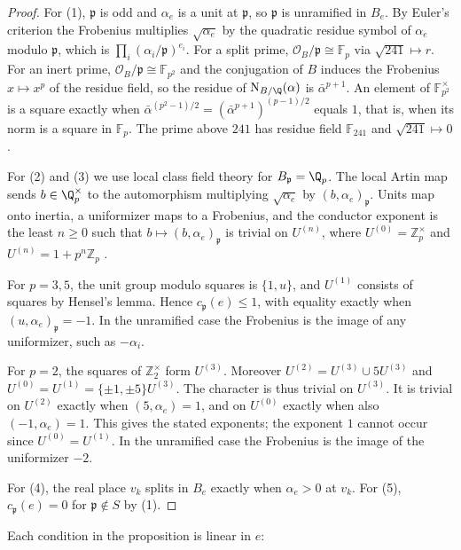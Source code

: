 \begin{proof}
For (1), $\mathfrak p$ is odd and $\alpha_e$ is a unit at $\mathfrak p$, so
$\mathfrak p$ is unramified in $B_e$. By Euler's criterion the Frobenius
multiplies $\sqrt{\alpha_e}$ by the quadratic residue symbol of $\alpha_e$
modulo $\mathfrak p$, which is $\prod_i(\alpha_i/\mathfrak p)^{e_i}$. For a
split prime, $\mathcal O_B/\mathfrak p\cong\mathbb F_p$ via $\sqrt{241}\mapsto
r$. For an inert prime, $\mathcal O_B/\mathfrak p\cong\mathbb F_{p^2}$ and
the conjugation of $B$ induces the Frobenius $x\mapsto x^p$ of the residue
field, so the residue of $\mathrm N_{B/\Q}(\alpha)$ is $\bar\alpha^{p+1}$. An element
of $\mathbb F_{p^2}^\times$ is a square exactly when
$\bar\alpha^{(p^2-1)/2}=(\bar\alpha^{p+1})^{(p-1)/2}$ equals $1$, that is,
when its norm is a square in $\mathbb F_p$. The prime above $241$ has
residue field $\mathbb F_{241}$ and $\sqrt{241}\mapsto0$.

For (2) and (3) we use local class field theory for $B_{\mathfrak p}=\Q_p$.
The local Artin map sends $b\in\Q_p^\times$ to the automorphism multiplying
$\sqrt{\alpha_e}$ by $(b,\alpha_e)_{\mathfrak p}$. Units map onto inertia, a
uniformizer maps to a Frobenius, and the conductor exponent is the least
$n\ge0$ such that $b\mapsto(b,\alpha_e)_{\mathfrak p}$ is trivial on
$U^{(n)}$, where $U^{(0)}=\mathbb Z_p^\times$ and $U^{(n)}=1+p^n\mathbb Z_p$
\cite{MilneCFT}.

For $p=3,5$, the unit group modulo squares is $\{1,u\}$, and $U^{(1)}$
consists of squares by Hensel's lemma. Hence $c_{\mathfrak p}(e)\le1$, with
equality exactly when $(u,\alpha_e)_{\mathfrak p}=-1$. In the unramified
case the Frobenius is the image of any uniformizer, such as $-\alpha_i$.

For $p=2$, the squares of $\mathbb Z_2^\times$ form $U^{(3)}$. Moreover
$U^{(2)}=U^{(3)}\cup5U^{(3)}$ and
$U^{(0)}=U^{(1)}=\{\pm1,\pm5\}U^{(3)}$. The character is thus trivial on
$U^{(3)}$. It is trivial on $U^{(2)}$ exactly when $(5,\alpha_e)=1$, and
on $U^{(0)}$ exactly when also $(-1,\alpha_e)=1$. This gives the stated
exponents; the exponent $1$ cannot occur since $U^{(0)}=U^{(1)}$. In the
unramified case the Frobenius is the image of the uniformizer $-2$.

For (4), the real place $v_k$ splits in $B_e$ exactly when $\alpha_e>0$ at
$v_k$. For (5), $c_{\mathfrak p}(e)=0$ for $\mathfrak p\notin S$ by (1).
\end{proof}

Each condition in the proposition is linear in $e$:

